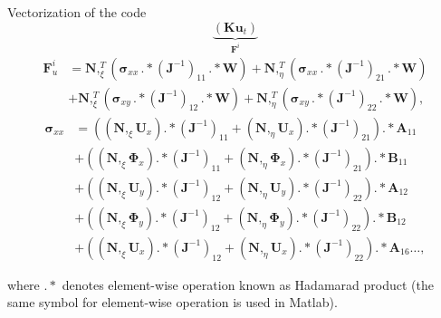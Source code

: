 \documentclass[10pt]{beamer} %
\renewcommand{\vec}[1]{\mathbf{#1}}
\newcommand{\bm}[1]{\mathbf{#1}}
\newcommand{\bs}[1]{\boldsymbol{#1}}
\begin{document}
\begin{frame}[t]{Vectorization of the code}
	\vspace{-0.4cm}
	\begin{equation*}
		\underbrace{\left(\bm{K} \vec{u}_t\right)}_{\vec{F}^i} 
	\end{equation*}
	\vspace{0.4cm}
	\begin{equation*}
	\begin{split}
	\vec{F}_u^i&=\bm{N},_{\xi}^T \left(\bs{\sigma}_{xx}\,.*(\vec{J}^{-1})_{11}\,.*\vec{W}\right)+\bm{N},_{\eta}^T \left(\bs{\sigma}_{xx}\,.*(\vec{J}^{-1})_{21}\,.*\vec{W}\right)\\
	&+\bm{N},_{\xi}^T \left(\bs{\sigma}_{xy}\,.*(\vec{J}^{-1})_{12}\,.*\vec{W}\right)+\bm{N},_{\eta}^T \left(\bs{\sigma}_{xy}\,.*(\vec{J}^{-1})_{22}\,.*\vec{W}\right), 
	\label{eq:internal_forces_u}
	\end{split}
	\end{equation*}
	\vspace{0.4cm}
	\begin{equation*}
	\begin{split}
	\bs{\sigma}_{xx}&=\left((\bm{N},_{\xi}\vec{U}_x).*(\vec{J}^{-1})_{11}+(\bm{N},_{\eta}\vec{U}_x).*(\vec{J}^{-1})_{21}\right).*\vec{A}_{11}\\
	&+\left((\bm{N},_{\xi}\bs{\Phi}_x).*(\vec{J}^{-1})_{11}+(\bm{N},_{\eta}\bs{\Phi}_x).*(\vec{J}^{-1})_{21}\right).*\vec{B}_{11}\\
	&+\left((\bm{N},_{\xi}\vec{U}_y).*(\vec{J}^{-1})_{12}+(\bm{N},_{\eta}\vec{U}_y).*(\vec{J}^{-1})_{22}\right).*\vec{A}_{12}\\
	&+\left((\bm{N},_{\xi}\bs{\Phi}_y).*(\vec{J}^{-1})_{12}+(\bm{N},_{\eta}\bs{\Phi}_y).*(\vec{J}^{-1})_{22}\right).*\vec{B}_{12}\\
	&+\left((\bm{N},_{\xi}\vec{U}_x).*(\vec{J}^{-1})_{12}+(\bm{N},_{\eta}\vec{U}_x).*(\vec{J}^{-1})_{22}\right).*\vec{A}_{16}\ldots,
	\end{split}
	\end{equation*}
	
	where $.*$ denotes element-wise operation known as Hadamarad product (the same symbol for element-wise operation is used in Matlab).
\end{frame}
\end{document}
